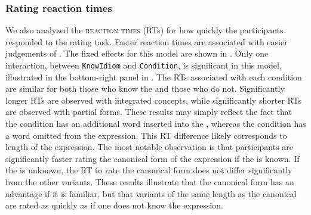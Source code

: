 \documentclass[output=paper
,modfonts
,nonflat]{langsci/langscibook}
\begin{document}
\subsubsection{Rating reaction times}

We also analyzed the \textsc{reaction times} (RTs) for how quickly the participants responded to the  rating task. Faster reaction times are associated with easier judgements of . The fixed effects for this model are shown in . Only one interaction, between \texttt{KnowIdiom} and \texttt{Condition}, is significant in this model, illustrated in the bottom-right panel in . The RTs associated with each condition are similar for both those who know the  and those who do not. Significantly longer RTs are observed with integrated concepts, while significantly shorter RTs are observed with partial forms. These results may simply reflect the fact that the  condition has an additional word inserted into the , whereas the  condition has a word omitted from the expression. This RT difference likely corresponds to length of the expression. The most notable observation is that participants are significantly faster rating the canonical form of the expression if the   is known. If the  is unknown, the RT to rate the canonical form does not differ significantly from the other variants. These results illustrate that the canonical form has an advantage if it is familiar, but that variants  of the same length as the canonical are rated as quickly as if one does not know the expression.\\ 
\end{document}
